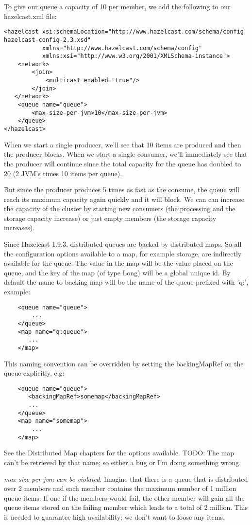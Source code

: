 To give our queue a capacity of 10 per member, we add the following to our hazelcast.xml file:
\begin{verbatim}
<hazelcast xsi:schemaLocation="http://www.hazelcast.com/schema/config hazelcast-config-2.3.xsd"
           xmlns="http://www.hazelcast.com/schema/config"
           xmlns:xsi="http://www.w3.org/2001/XMLSchema-instance">
    <network>
        <join>
            <multicast enabled="true"/>
        </join>
   </network>
    <queue name="queue">
        <max-size-per-jvm>10</max-size-per-jvm>
    </queue>
</hazelcast>
\end{verbatim}

When we start a single producer, we'll see that 10 items are produced and then the producer blocks. When we start a single consumer, we'll immediately see that the producer will continue since the total capacity for the queue has doubled to 20 (2 JVM's times 10 items per queue). 

But since the producer produces 5 times as fast as the consume, the queue will reach its maximum capacity again quickly and it will block. We can can increase the capacity of the cluster by starting new consumers (the processing and the storage capacity increase) or just empty members (the storage capacity increases).

Since Hazelcast 1.9.3, distributed queues are backed by distributed maps. So all the configuration options available to a map, for example storage, are indirectly available for the queue. The value in the map will be the value placed on the queue, and the key of the map (of type Long) will be a global unique id. By default the name to backing map will be the name of the queue prefixed with 'q:', example:
\begin{verbatim}
    <queue name="queue">
        ...
    </queue>
    <map name="q:queue">
       ...
    </map>
\end{verbatim}

This naming convention can be overridden by setting the backingMapRef on the queue explicitly, e.g:
\begin{verbatim}
    <queue name="queue">
       <backingMapRef>somemap</backingMapRef>
       ... 
    </queue>
    <map name="somemap">
        ...
    </map>
\end{verbatim}
See the Distributed Map chapters for the options available.
TODO: The map can't be retrieved by that name; so either a bug or I'm doing something wrong.

\emph{max-size-per-jvm can be violated}. Imagine that there is a queue that is distributed over 2 members and each member contains the maximum number of 1 million queue items. If one if the members would fail, the other member will gain all the queue items stored on the failing member which leads to a total of 2 million. This is needed to guarantee high availability; we don't want to loose any items. 

